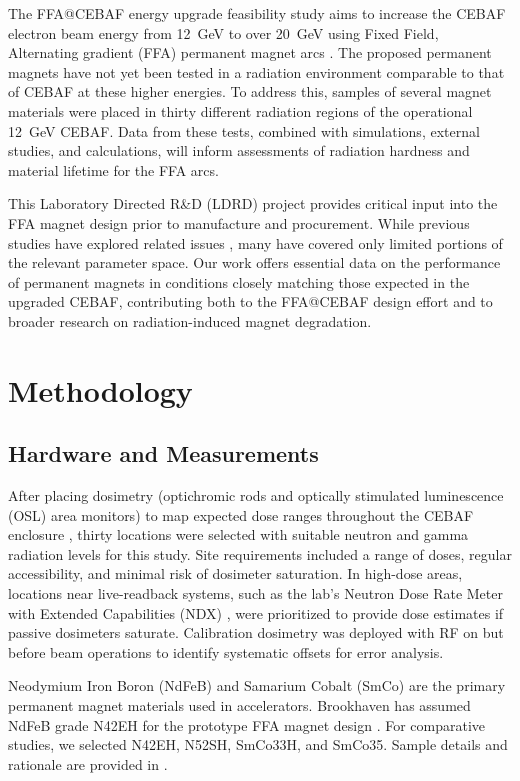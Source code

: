 \documentclass[a4paper,
               ]{jacow}
\begin{document}
The FFA@CEBAF energy upgrade feasibility study aims to increase the CEBAF electron beam energy from \SI{12}{GeV} to over \SI{20}{GeV} using Fixed Field, Alternating gradient (FFA) permanent magnet arcs \cite{Khan:ipac2024-mopr08}. The proposed permanent magnets have not yet been tested in a radiation environment comparable to that of CEBAF at these higher energies. To address this, samples of several magnet materials were placed in thirty different radiation regions of the operational \SI{12}{GeV} CEBAF. Data from these tests, combined with simulations, external studies, and calculations, will inform assessments of radiation hardness and material lifetime for the FFA arcs.

This Laboratory Directed R\&D (LDRD) project provides critical input into the FFA magnet design prior to manufacture and procurement. While previous studies have explored related issues \cite{Shepherd:Radiation}, many have covered only limited portions of the relevant parameter space. Our work offers essential data on the performance of permanent magnets in conditions closely matching those expected in the upgraded CEBAF, contributing both to the FFA@CEBAF design effort and to broader research on radiation-induced magnet degradation.

\section{Methodology}
\subsection{Hardware and Measurements}
After placing dosimetry (optichromic rods and optically stimulated luminescence (OSL) area monitors) to map expected dose ranges throughout the CEBAF enclosure \cite{Bodenstein:ipac2025-thpb093, Bodenstein:ipac2024-thps58}, thirty locations were selected with suitable neutron and gamma radiation levels for this study. Site requirements included a range of doses, regular accessibility, and minimal risk of dosimeter saturation. In high-dose areas, locations near live-readback systems, such as the lab's Neutron Dose Rate Meter with Extended Capabilities (NDX) \cite{NDX}, were prioritized to provide dose estimates if passive dosimeters saturate. Calibration dosimetry was deployed with RF on but before beam operations to identify systematic offsets for error analysis.

Neodymium Iron Boron (NdFeB) and Samarium Cobalt (SmCo) are the primary permanent magnet materials used in accelerators. Brookhaven has assumed NdFeB grade N42EH for the prototype FFA magnet design \cite{Brooks:IPAC22-THPOTK011}. For comparative studies, we selected N42EH, N52SH, SmCo33H, and SmCo35. Sample details and rationale are provided in \cite{Bodenstein:ipac2024-thps58}.
\end{document}
